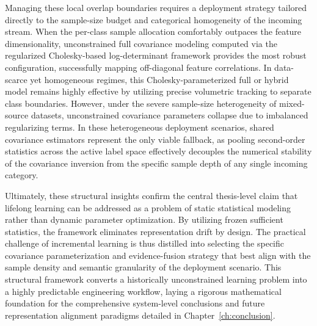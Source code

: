 Managing these local overlap boundaries requires a deployment strategy tailored directly to the sample-size budget and categorical homogeneity of the incoming stream. When the per-class sample allocation comfortably outpaces the feature dimensionality, unconstrained full covariance modeling computed via the regularized Cholesky-based log-determinant framework provides the most robust configuration, successfully mapping off-diagonal feature correlations. In data-scarce yet homogeneous regimes, this Cholesky-parameterized full or hybrid model remains highly effective by utilizing precise volumetric tracking to separate class boundaries. However, under the severe sample-size heterogeneity of mixed-source datasets, unconstrained covariance parameters collapse due to imbalanced regularizing terms. In these heterogeneous deployment scenarios, shared covariance estimators represent the only viable fallback, as pooling second-order statistics across the active label space effectively decouples the numerical stability of the covariance inversion from the specific sample depth of any single incoming category.

Ultimately, these structural insights confirm the central thesis-level claim that lifelong learning can be addressed as a problem of static statistical modeling rather than dynamic parameter optimization. By utilizing frozen sufficient statistics, the framework eliminates representation drift by design. The practical challenge of incremental learning is thus distilled into selecting the specific covariance parameterization and evidence-fusion strategy that best align with the sample density and semantic granularity of the deployment scenario. This structural framework converts a historically unconstrained learning problem into a highly predictable engineering workflow, laying a rigorous mathematical foundation for the comprehensive system-level conclusions and future representation alignment paradigms detailed in Chapter~\ref{ch:conclusion}.